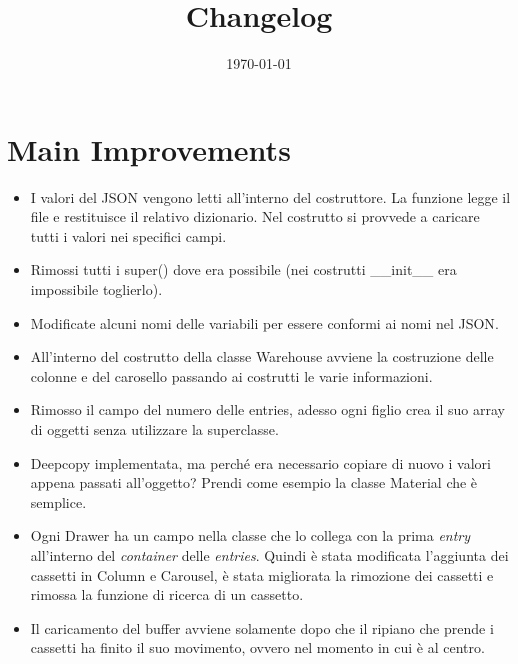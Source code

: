 \documentclass[a4paper]{article}
\begin{document}
	\title{Changelog}
	\date{\today}
	\maketitle
	
	\newpage
	
	\section*{Main Improvements}
	
	\begin{itemize}[label=]
		\item I valori del \textsf{JSON} vengono letti all'interno del costruttore. La funzione legge il file e restituisce il relativo dizionario. Nel costrutto si provvede a caricare tutti i valori nei specifici campi.
		
		\item Rimossi tutti i \textsf{super()} dove era possibile (nei costrutti \textsf{\_\_init\_\_} era impossibile toglierlo).
		
		\item Modificate alcuni nomi delle variabili per essere conformi ai nomi nel \textsf{JSON}.
		
		\item All'interno del costrutto della classe \textsf{Warehouse} avviene la costruzione delle colonne e del carosello passando ai costrutti le varie informazioni.
		
		\item Rimosso il campo del numero delle entries, adesso ogni figlio crea il suo array di oggetti senza utilizzare la superclasse.
		
		\item \textsf{Deepcopy} implementata, ma perché era necessario copiare di nuovo i valori appena passati all'oggetto? Prendi come esempio la classe \textsf{Material} che è semplice.
		
		\item Ogni \textsf{Drawer} ha un campo nella classe che lo collega con la prima \emph{entry} all'interno del \emph{container} delle \emph{entries}. Quindi è stata modificata l'aggiunta dei cassetti in \textsf{Column} e \textsf{Carousel}, è stata migliorata la rimozione dei cassetti e rimossa la funzione di ricerca di un cassetto.
		
		\item Il caricamento del \textsf{buffer} avviene solamente dopo che il ripiano che prende i cassetti ha finito il suo movimento, ovvero nel momento in cui è al centro.	
	\end{itemize}
\end{document}

